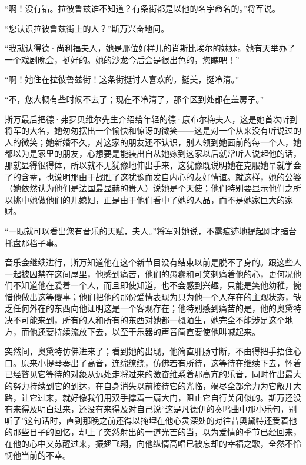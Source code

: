 \par “啊！没有错。拉彼鲁兹谁不知道？有条街都是以他的名字命名的。”将军说。
\par “您认识拉彼鲁兹街上的人？”斯万兴奋地问。
\par “我就认得德·尚利福夫人，她是那位好样儿的肖斯比埃尔的妹妹。她有天举办了一个戏剧晚会，挺好的。她的沙龙今后会是很出色的，您瞧吧！”
\par “啊！她住在拉彼鲁兹街！这条街挺讨人喜欢的，挺美，挺冷清。”
\par “不，您大概有些时候不去了；现在不冷清了，那个区到处都在盖房子。”
\par 斯万最后把德·弗罗贝维尔先生介绍给年轻的德·康布尔梅夫人，这是她首次听到将军的大名，她匆匆摆出一个愉快和惊讶的微笑——这是对一个从来没有听说过的人的微笑；她新婚不久，对这家的朋友还不认识，别人领到她面前的每一个人，她都以为是家里的朋友，心想要是能装出自从她嫁到这家以后就常听人说起他的话，那就显得很得体，所以就不无犹豫地伸出手来，这犹豫既说明她在克服她早就学会了的含蓄，也说明那由于战胜了这犹豫而发自内心的友好情谊。就这样，她的公婆（她依然认为他们是法国最显赫的贵人）说她是个天使；他们特别要显示他们之所以挑中她做他们的儿媳妇，正是由于他们看中了她的人品，而不是她家巨大的家财。
\par “一眼就可以看出您有音乐的天赋，夫人。”将军对她说，不露痕迹地提起刚才蜡台托盘那档子事。
\par 音乐会继续进行，斯万知道他在这个新节目没有结束以前是脱不了身的。跟这些人一起被囚禁在这间屋里，他感到痛苦，他们的愚蠢和可笑刺痛着他的心，更何况他们不知道他在爱着一个人，而且即使知道，也不会感到兴趣，只能是笑他幼稚，惋惜他做出这等傻事；他们把他的那份爱情表现为只为他一个人存在的主观状态，缺乏任何外在的东西向他证明这是一个客观存在；他特别感到痛苦的是，他的奥黛特决不可能来到，所有的人和所有的东西对她都一概陌生，她完全不能涉足这个地方，而他还要持续流放下去，以至于乐器的声音简直要使他叫喊起来。
\par 突然间，奥黛特仿佛进来了；看到她的出现，他简直肝肠寸断，不由得把手捂住心口。原来小提琴奏出了高音，连绵缭绕，仿佛若有所待，这等待在继续下去，怀着已经瞥见它等待的对象从远处走将过来的激奋维系着那高亢的乐音，同时作出最大的努力持续到它的到达，在自身消失以前接待它的光临，竭尽全部余力为它敞开大路，让它过来，就好像我们用双手撑着一扇大门，阻止它自行关闭似的。斯万还没有来得及明白过来，还没有来得及对自己说“这是凡德伊的奏鸣曲中那小乐句，别听了”这句话时，直到那晚之前还得以掩埋在他心灵深处的对往昔奥黛特还爱着他的那些日子的回忆，却上了突然射出的一道光芒的当，以为爱情的季节已经回来，在他的心中又苏醒过来，振翅飞翔，向他纵情高唱已被忘却的幸福之歌，全然不怜悯他当前的不幸。
